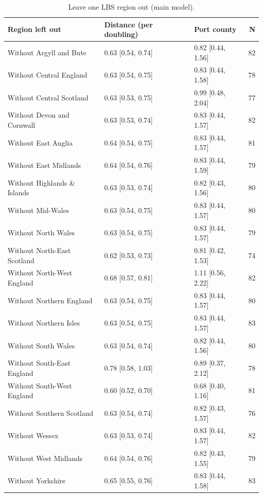 \documentclass[11pt,a4paper]{article}
\begin{document}
\begin{table}[htbp]\centering\footnotesize\caption{Leave one LBS region out (main model).}\label{tab:loro}\begin{tabular}{p{7.2cm}llr}\toprule Region left out & Distance (per doubling) & Port county & N\\\midrule
Without Argyll and Bute & 0.63 [0.54, 0.74] & 0.82 [0.44, 1.56] & 82\\
Without Central England & 0.63 [0.54, 0.75] & 0.83 [0.44, 1.58] & 78\\
Without Central Scotland & 0.63 [0.53, 0.75] & 0.99 [0.48, 2.04] & 77\\
Without Devon and Cornwall & 0.63 [0.53, 0.74] & 0.83 [0.44, 1.57] & 82\\
Without East Anglia & 0.64 [0.54, 0.75] & 0.83 [0.44, 1.57] & 81\\
Without East Midlands & 0.64 [0.54, 0.76] & 0.83 [0.44, 1.59] & 79\\
Without Highlands \& Islands & 0.63 [0.53, 0.74] & 0.82 [0.43, 1.56] & 80\\
Without Mid-Wales & 0.63 [0.54, 0.75] & 0.83 [0.44, 1.57] & 80\\
Without North Wales & 0.63 [0.54, 0.75] & 0.83 [0.44, 1.57] & 79\\
Without North-East Scotland & 0.62 [0.53, 0.73] & 0.81 [0.42, 1.53] & 74\\
Without North-West England & 0.68 [0.57, 0.81] & 1.11 [0.56, 2.22] & 82\\
Without Northern England & 0.63 [0.54, 0.75] & 0.83 [0.44, 1.57] & 80\\
Without Northern Isles & 0.63 [0.54, 0.75] & 0.83 [0.44, 1.57] & 83\\
Without South Wales & 0.63 [0.54, 0.74] & 0.82 [0.44, 1.56] & 80\\
Without South-East England & 0.78 [0.58, 1.03] & 0.89 [0.37, 2.12] & 78\\
Without South-West England & 0.60 [0.52, 0.70] & 0.68 [0.40, 1.16] & 81\\
Without Southern Scotland & 0.63 [0.54, 0.74] & 0.82 [0.43, 1.57] & 76\\
Without Wessex & 0.63 [0.53, 0.74] & 0.83 [0.44, 1.57] & 82\\
Without West Midlands & 0.64 [0.54, 0.76] & 0.82 [0.43, 1.55] & 79\\
Without Yorkshire & 0.65 [0.55, 0.76] & 0.83 [0.44, 1.58] & 83\\
\bottomrule\end{tabular}\end{table}
\end{document}

